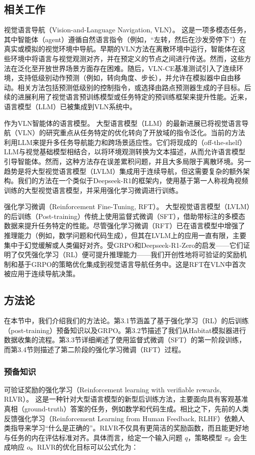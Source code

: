 \subsection{ 相关工作}

视觉语言导航（Vision-and-Language Navigation, VLN）。 这是一项多模态任务，其中智能体（agent）遵循自然语言指令（例如，“左转，然后在沙发旁停下”）在真实或模拟的视觉环境中导航。早期的VLN方法在离散环境中运行，智能体在这些环境中将语言与视觉观测对齐，并在预定义的节点之间进行传送。然而，这些方法在泛化至开放世界场景方面存在困难。随后，VLN-CE基准测试引入了连续环境，支持低级别动作预测（例如，转向角度、步长），并允许在模拟器中自由移动。相关方法包括预测低级别的控制指令，或选择由路点预测器生成的子目标。后续的进展利用了视觉语言预训练模型或任务特定的预训练框架来提升性能。近来，语言模型（LLM）已被集成到VLN系统中。

作为VLN智能体的语言模型。 大型语言模型（LLM）的最新进展已将视觉语言导航（VLN）的研究重点从任务特定的优化转向了开放域的指令泛化。当前的方法利用LLM来提升多任务导航能力和跨场景适应性。它们将现成的（off-the-shelf）LLM与视觉基础模型相结合，以将环境观测转换为文本描述，从而允许语言模型引导智能体。然而，这种方法存在误差累积问题，并且大多局限于离散环境。另一趋势是将大型视觉语言模型（LVLM）集成用于连续导航，但这需要复杂的额外架构。我们的方法在一个类似于Deepseek-R1的框架内，使用基于第一人称视角视频训练的大型视觉语言模型，并采用强化学习微调进行训练。

强化学习微调（Reinforcement Fine-Tuning, RFT）。 大型视觉语言模型（LVLM）的后训练（Post-training）传统上使用监督式微调（SFT），借助带标注的多模态数据来提升任务特定的性能。尽管强化学习微调（RFT）已在语言模型中增强了推理能力（例如，数学问题和代码生成），但其在LVLM上的应用一直有限，主要集中于幻觉缓解或人类偏好对齐。受GRPO和Deepseek-R1-Zero的启发——它们证明了仅凭强化学习（RL）便可提升推理能力——我们开创性地将可验证的奖励机制和基于GRPO的策略优化集成到视觉语言导航任务中。这是RFT在VLN中首次被应用于连续导航决策。

\subsection{ 方法论}
在本节中，我们介绍我们的方法论。第3.1节涵盖了基于强化学习（RL）的后训练（post-training）预备知识以及GRPO。第3.2节描述了我们从Habitat模拟器进行数据收集的流程。第3.3节详细阐述了使用监督式微调（SFT）的第一阶段训练，而第3.4节则描述了第二阶段的强化学习微调（RFT）过程。

\subsubsection{预备知识}
可验证奖励的强化学习（Reinforcement learning with verifiable rewards, RLVR）。 这是一种针对大型语言模型的新型后训练方法，主要面向具有客观基准真相（ground-truth）答案的任务，例如数学和代码生成。相比之下，先前的人类反馈强化学习（Reinforcement Learning from Human Feedback, RLHF）依赖人类指导来学习“什么是正确的”。RLVR不仅具有更简洁的奖励函数，而且能更好地与任务的内在评估标准对齐。具体而言，给定一个输入问题 $ q $，策略模型 $ \pi_\theta $ 会生成响应 $ o $。RLVR的优化目标可以公式化为：

